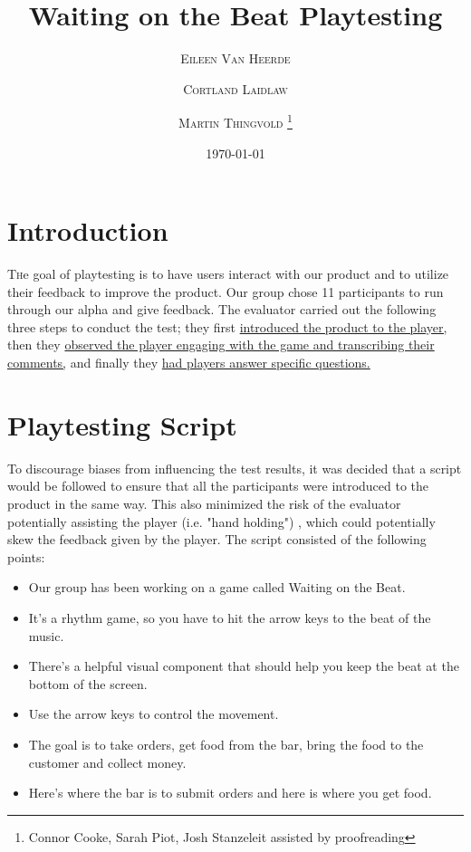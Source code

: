 \documentclass[twoside,twocolumn]{article}
\title{Waiting on the Beat Playtesting} %
\author{%
\textsc{Eileen Van Heerde}
\and
\textsc{Cortland Laidlaw}
\and
\textsc{Martin Thingvold} \thanks{Connor Cooke, Sarah Piot, Josh Stanzeleit assisted by proofreading}\\
}
\date{\today} %
\begin{document}
\maketitle


\section{Introduction}

\lettrine[nindent=0em,lines=3]{T} he goal of playtesting is to have users interact
with our product and to utilize their feedback to improve the product. Our group chose
11
participants to run through our alpha and give feedback. The evaluator carried out the following three steps to conduct the test; they first \hyperlink{section.2}{introduced the product to the player,} then they \hyperlink{section.3}{observed the player engaging with the
game and transcribing their comments,} and finally they \hyperlink{section.4}{had players answer specific questions.}





\section{Playtesting Script}
\label{sec:script}
To discourage biases from influencing the test results, it was decided that a script would be followed to ensure that
 all the participants were introduced to the product in the same way.
 This also minimized the risk of the evaluator potentially assisting the player (i.e. "hand holding") , 
which could potentially skew the feedback given by the player. The script consisted of the following points:

\begin{itemize}
\item Our group has been working on a game called Waiting on the Beat.
\item It's a rhythm game, so you have to hit the arrow keys to the beat of the music.
\item There's a helpful visual component that should help you keep the beat at the bottom of the screen.
\item Use the arrow keys to control the movement.
\item The goal is to take orders, get food from the bar, bring the food to the customer and collect money.
\item Here's where the bar is to submit orders and here is where you get food.
\end{itemize}
\end{document}
